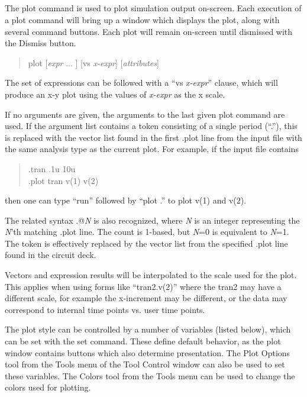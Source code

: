 \subsection{}
\label{plotcmd}


The {\cb plot} command is used to plot simulation output on-screen. 
Each execution of a {\cb plot} command will bring up a window which
displays the plot, along with several command buttons.  Each plot will
remain on-screen until dismissed with the {\cb Dismiss} button.
\begin{quote}\vt
plot [{\it expr} ... ] [vs {\it x-expr}] [{\it attributes\/}]
\end{quote}
The set of expressions can be followed with a ``{\vt vs} {\it x-expr}''
clause, which will produce an x-y plot using the values of {\it
x-expr} as the x scale.

If no arguments are given, the arguments to the last given {\cb plot}
command are used.  If the argument list contains a token consisting of
a single period (``.''), this is replaced with the vector list found
in the first {\vt .plot} line from the input file with the same
analysis type as the current plot.  For example, if the input file
contains
\begin{quote}\vt
    .tran .1u 10u\\
    .plot tran v(1) v(2)\\
\end{quote}
then one can type ``{\vt run}'' followed by ``{\vt plot .}'' to plot
{\vt v(1)} and {\vt v(2)}.

The related syntax {\vt .@}{\it N} is also recognized, where {\it N}
is an integer representing the {\it N\/}'th matching {\vt .plot} line. 
The count is 1-based, but {\it N\/}=0 is equivalent to {\it N\/}=1. 
The token is effectively replaced by the vector list from the
specified {\vt .plot} line found in the circuit deck.

Vectors and expression results will be interpolated to the scale used
for the plot.  This applies when using forms like ``{\vt tran2.v(2)}''
where the {\vt tran2} may have a different scale, for example the
x-increment may be different, or the data may correspond to internal
time points vs.  user time points.

The plot style can be controlled by a number of variables (listed
below), which can be set with the {\cb set} command.  These define
default behavior, as the plot window contains buttons which also
determine presentation.  The {\cb Plot Options} tool from the {\cb
Tools} menu of the {\cb Tool Control} window can also be used to set
these variables.  The {\cb Colors} tool from the {\cb Tools} menu can
be used to change the colors used for plotting.

